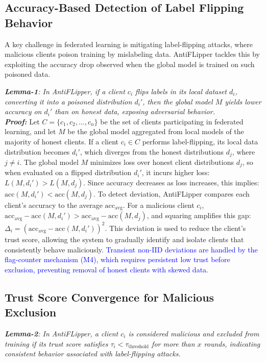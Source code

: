 \documentclass[conference]{IEEEtran}
\begin{document}
\subsection{Accuracy-Based Detection of Label Flipping Behavior} A key challenge in federated learning is mitigating label-flipping attacks, where malicious clients poison training by mislabeling data. AntiFLipper tackles this by exploiting the accuracy drop observed when the global model is trained on such poisoned data.

\textit{\textbf{Lemma-1}: In AntiFLipper, if a client \( c_i \) flips labels in its local dataset \( d_i \), converting it into a poisoned distribution \( d_i' \), then the global model \( M \) yields lower accuracy on \( d_i' \) than on honest data, exposing adversarial behavior.} \\

\textit{\textbf{Proof:}} Let \( C = \{c_1, c_2, \ldots, c_n\} \) be the set of clients participating in federated learning, and let \( M \) be the global model aggregated from local models of the majority of honest clients. If a client \( c_i \in C \) performs label-flipping, its local data distribution becomes \( d_i' \), which diverges from the honest distributions \( d_j \), where \( j \neq i \). The global model \( M \) minimizes loss over honest client distributions \( d_j \), so when evaluated on a flipped distribution \( d_i' \), it incurs higher loss: \(L(M, d_i') > L(M, d_j).\) Since accuracy decreases as loss increases, this implies: \(\text{acc}(M, d_i') < \text{acc}(M, d_j).\) To detect deviation, AntiFLipper compares each client’s accuracy to the average \( \text{acc}_{\text{avg}} \). For a malicious client \( c_i \), \( \text{acc}_{\text{avg}} - \text{acc}(M, d_i') > \text{acc}_{\text{avg}} - \text{acc}(M, d_j) \), and squaring amplifies this gap: \( \Delta_i = (\text{acc}_{\text{avg}} - \text{acc}(M, d_i'))^2 \). This deviation is used to reduce the client's trust score, allowing the system to gradually identify and isolate clients that consistently behave maliciously.
\textcolor{blue}{Transient non-IID deviations are handled by the flag-counter mechanism (M4), which requires persistent low trust before exclusion, preventing removal of honest clients with skewed data.}

\subsection{Trust Score Convergence for Malicious Exclusion}
\textit{\textbf{Lemma-2}: In AntiFLipper, a client \( c_i \) is considered malicious and excluded from training if its trust score satisfies \( \tau_i < \tau_{\text{threshold}} \) for more than \( x \)  rounds, indicating consistent behavior associated with label-flipping attacks.} \\
\end{document}
